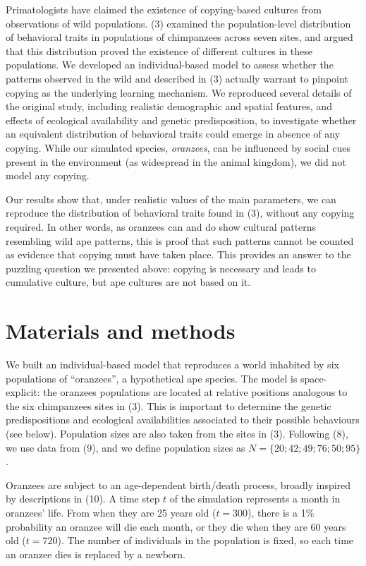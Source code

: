 \documentclass[9pt,twocolumn,twoside,]{pnas-new}
\begin{document}
Primatologists have claimed the existence of copying-based cultures from
observations of wild populations. (3) examined the population-level
distribution of behavioral traits in populations of chimpanzees across
seven sites, and argued that this distribution proved the existence of
different cultures in these populations. We developed an
individual-based model to assess whether the patterns observed in the
wild and described in (3) actually warrant to pinpoint copying as the
underlying learning mechanism. We reproduced several details of the
original study, including realistic demographic and spatial features,
and effects of ecological availability and genetic predisposition, to
investigate whether an equivalent distribution of behavioral traits
could emerge in absence of any copying. While our simulated species,
\emph{oranzees}, can be influenced by social cues present in the
environment (as widespread in the animal kingdom), we did not model any
copying.

Our results show that, under realistic values of the main parameters, we
can reproduce the distribution of behavioral traits found in (3),
without any copying required. In other words, as oranzees can and do
show cultural patterns resembling wild ape patterns, this is proof that
such patterns cannot be counted as evidence that copying must have taken
place. This provides an answer to the puzzling question we presented
above: copying is necessary and leads to cumulative culture, but ape
cultures are not based on it.

\section*{Materials and methods}\label{materials-and-methods}

We built an individual-based model that reproduces a world inhabited by
six populations of ``oranzees'', a hypothetical ape species. The model
is space-explicit: the oranzees populations are located at relative
positions analogous to the six chimpanzees sites in (3). This is
important to determine the genetic predispositions and ecological
availabilities associated to their possible behaviours (see below).
Population sizes are also taken from the sites in (3). Following (8), we
use data from (9), and we define population sizes as
\(N=\{20;42;49;76;50;95\}\).

Oranzees are subject to an age-dependent birth/death process, broadly
inspired by descriptions in (10). A time step \(t\) of the simulation
represents a month in oranzees' life. From when they are 25 years old
(\(t=300\)), there is a 1\% probability an oranzee will die each month,
or they die when they are 60 years old (\(t=720\)). The number of
individuals in the population is fixed, so each time an oranzee dies is
replaced by a newborn.
\end{document}
